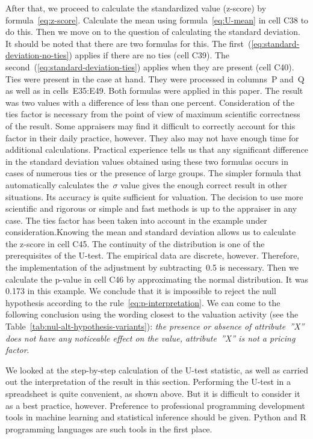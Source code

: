 \documentclass[]{scrreprt}
\begin{document}
After that, we proceed to calculate the standardized value (z-score) by formula~\ref{eq:z-score}. Calculate the mean using formula~\ref{eq:U-mean} in cell C38 to do this. Then we move on to the question of calculating the standard deviation. It should be noted that there are two formulas for this. The first~(\ref{eq:standard-deviation-no-ties}) applies if there are no ties (cell C39). The second~(\ref{eq:standard-deviation-ties}) applies when they are present (cell C40). Ties were present in the case at hand. They were processed in columns~P and~Q as well as in cells~E35:E49. Both formulas were applied in this paper. The result was two values with a difference of less than one percent. Consideration of the ties factor is necessary from the point of view of maximum scientific correctness of the result. Some appraisers may find it difficult to correctly account for this factor in their daily practice, however. They also may not have enough time for additional calculations. Practical experience tells us that any significant difference in the standard deviation values obtained using these two formulas occurs in cases of numerous ties or the presence of large groups. The simpler formula that automatically calculates the~${\sigma}$ value gives the enough correct result in other situations. Its accuracy is quite sufficient for valuation. The decision to use more scientific and rigorous or simple and fast methods is up to the appraiser in any case. The ties factor has been taken into account in the example under consideration.Knowing the mean and standard deviation allows us to calculate the z-score in cell C45. The continuity of the distribution is one of the prerequisites of the U-test. The empirical data are discrete, however. Therefore, the implementation of the adjustment by subtracting~0.5 is necessary. Then we calculate the p-value in cell C46 by approximating the normal distribution. It was 0.173 in this example. We conclude that it is impossible to reject the null hypothesis according to the rule~\ref{eq:p-interpretation}. We can come to the following conclusion using the wording closest to the valuation activity (see the Table~\ref{tab:nul-alt-hypothesis-variants}): \emph{the presence or absence of attribute~''X'' does not have any noticeable effect on the value, attribute~''X'' is not a pricing factor}.

We looked at the step-by-step calculation of the U-test statistic, as well as carried out the interpretation of the result in this section. Performing the U-test in a spreadsheet is quite convenient, as shown above. But it is difficult to consider it as a best practice, however. Preference to professional programming development tools in machine learning and statistical inference should be given. Python and R programming languages are such tools in the first place.
%
\clearpage
%
\end{document}
